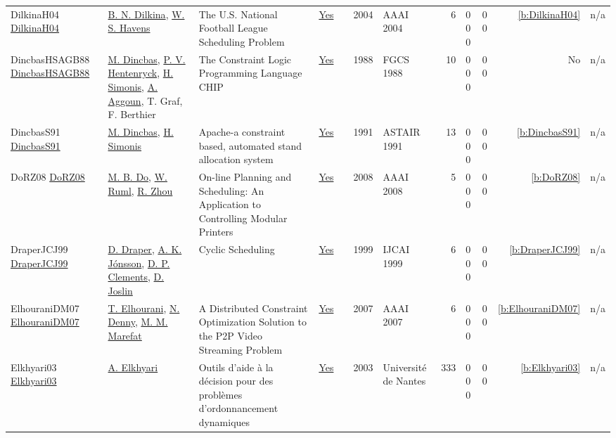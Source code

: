 {\begin{longtable}{>{\raggedright\arraybackslash}p{3cm}>{\raggedright\arraybackslash}p{4.5cm}>{\raggedright\arraybackslash}p{6.0cm}rrrp{2.5cm}rp{1cm}p{1cm}rr}
DilkinaH04 \href{}{DilkinaH04} & \hyperref[auth:a267]{B. N. Dilkina}, \hyperref[auth:a269]{W. S. Havens} & The {U.S.} National Football League Scheduling Problem & \href{../works/DilkinaH04.pdf}{Yes} & \cite{DilkinaH04} & 2004 & AAAI 2004 & 6 & 0 0 0 & 0 0 & \ref{b:DilkinaH04} & n/a\\
DincbasHSAGB88 \href{}{DincbasHSAGB88} & \hyperref[auth:a717]{M. Dincbas}, \hyperref[auth:a148]{P. V. Hentenryck}, \hyperref[auth:a17]{H. Simonis}, \hyperref[auth:a725]{A. Aggoun}, T. Graf, F. Berthier & The Constraint Logic Programming Language {CHIP} & \href{../works/DincbasHSAGB88.pdf}{Yes} & \cite{DincbasHSAGB88} & 1988 & FGCS 1988 & 10 & 0 0 0 & 0 0 & No & n/a\\
DincbasS91 \href{}{DincbasS91} & \hyperref[auth:a717]{M. Dincbas}, \hyperref[auth:a17]{H. Simonis} & Apache-a constraint based, automated stand allocation system & \href{../works/DincbasS91.pdf}{Yes} & \cite{DincbasS91} & 1991 & ASTAIR 1991 & 13 & 0 0 0 & 0 0 & \ref{b:DincbasS91} & n/a\\
DoRZ08 \href{http://www.aaai.org/Library/AAAI/2008/aaai08-253.php}{DoRZ08} & \hyperref[auth:a1346]{M. B. Do}, \hyperref[auth:a1347]{W. Ruml}, \hyperref[auth:a1348]{R. Zhou} & On-line Planning and Scheduling: An Application to Controlling Modular Printers & \href{../works/DoRZ08.pdf}{Yes} & \cite{DoRZ08} & 2008 & AAAI 2008 & 5 & 0 0 0 & 0 0 & \ref{b:DoRZ08} & n/a\\
DraperJCJ99 \href{http://ijcai.org/Proceedings/99-2/Papers/050.pdf}{DraperJCJ99} & \hyperref[auth:a1440]{D. Draper}, \hyperref[auth:a1042]{A. K. J{\'{o}}nsson}, \hyperref[auth:a1441]{D. P. Clements}, \hyperref[auth:a1442]{D. Joslin} & Cyclic Scheduling & \href{../works/DraperJCJ99.pdf}{Yes} & \cite{DraperJCJ99} & 1999 & IJCAI 1999 & 6 & 0 0 0 & 0 0 & \ref{b:DraperJCJ99} & n/a\\
ElhouraniDM07 \href{http://www.aaai.org/Library/AAAI/2007/aaai07-213.php}{ElhouraniDM07} & \hyperref[auth:a1343]{T. Elhourani}, \hyperref[auth:a1344]{N. Denny}, \hyperref[auth:a1345]{M. M. Marefat} & A Distributed Constraint Optimization Solution to the {P2P} Video Streaming Problem & \href{../works/ElhouraniDM07.pdf}{Yes} & \cite{ElhouraniDM07} & 2007 & AAAI 2007 & 6 & 0 0 0 & 0 0 & \ref{b:ElhouraniDM07} & n/a\\
Elkhyari03 \href{https://theses.hal.science/tel-00008377}{Elkhyari03} & \hyperref[auth:a292]{A. Elkhyari} & {Outils d'aide {\`a} la d{\'e}cision pour des probl{\`e}mes d'ordonnancement dynamiques} & \href{../works/Elkhyari03.pdf}{Yes} & \cite{Elkhyari03} & 2003 & {Universit{\'e} de Nantes} & 333 & 0 0 0 & 0 0 & \ref{b:Elkhyari03} & n/a\\

\end{longtable}}
